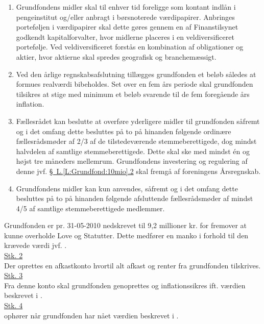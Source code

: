 \begin{enumerate}
\item Grundfondens midler skal til enhver tid foreligge som kontant indlån i pengeinstitut og/eller anbragt i børsnoterede værdipapirer. Anbringes porteføljen i værdipapirer skal dette gøres gennem en af Finanstilsynet godkendt kapitalforvalter, hvor midlerne placeres i en veldiversificeret portefølje. Ved veldiversificeret forstås en kombination af obligationer og aktier, hvor aktierne skal spredes geografisk og branchemæssigt.
\item Ved den årlige regnskabsafslutning tillægges grundfonden et beløb således at formues realværdi bibeholdes. Set over en fem års periode skal grundfonden tilsikres at stige med minimum et beløb svarende til de fem foregående års inflation.
\item Fællesrådet kan beslutte at overføre yderligere midler til grundfonden såfremt og i det omfang dette besluttes på to på hinanden følgende ordinære fællesrådsmøder af 2/3 af de tilstedeværende stemmeberettigede, dog mindst halvdelen af samtlige stemmeberettigede. Dette skal ske med mindst én og højst tre måneders mellemrum. Grundfondens investering og regulering af denne jvf. \hyperref[L:Grundfond:10mio]{\S \ L.\ref*{L:Grundfond:10mio}.2} skal fremgå af foreningens Årsregnskab.
\item Grundfondens midler kan kun anvendes, såfremt og i det omfang dette besluttes på to på hinanden følgende afsluttende fællesrådsmøder af mindst 4/5 af samtlige stemmeberettigede medlemmer.
\end{enumerate}

\item \label{L:Grundfond:9.2mio} Grundfonden er pr. 31-05-2010 nedskrevet til 9,2 millioner kr. for fremover at kunne overholde Love og Statutter. Dette medfører en manko i forhold til den krævede værdi jvf. .\\

\underline{Stk. 2}\\
Der oprettes en afkastkonto hvortil alt afkast og renter fra grundfonden tilskrives.\\

\underline{Stk. 3}\\
Fra denne konto skal grundfonden genoprettes og inflationssikres ift. værdien beskrevet i .\\


\underline{Stk. 4}\\
 ophører når grundfonden har nået værdien beskrevet i .
